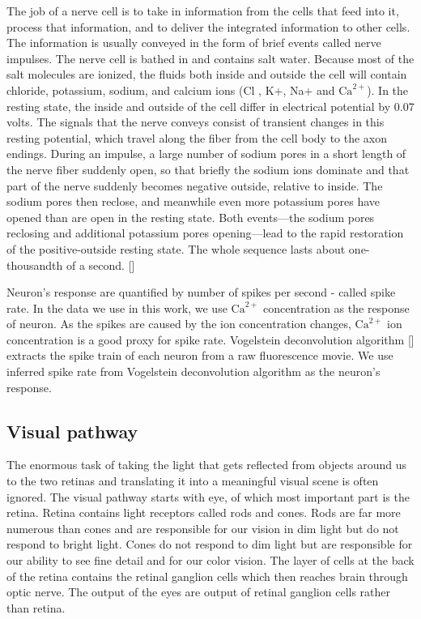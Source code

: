 \documentclass[MTech]{iitmdiss}
\begin{document}
The job of a nerve cell is to take in information from the cells that feed into it, process that information, and to deliver the integrated information to other cells. The information is usually conveyed in the form of brief events called nerve impulses. The nerve cell is bathed in and contains salt water. Because most of the salt molecules are ionized, the fluids both inside and outside the cell will contain chloride, potassium, sodium, and calcium ions (Cl , K+, Na+ and $\text{Ca}^{2+}$).
In the resting state, the inside and outside of the cell differ in electrical potential by 0.07 volts. The signals that the nerve conveys consist of transient changes in this resting potential, which travel along the fiber from the cell body to the axon endings. During an impulse, a large number of sodium pores in a short length of the nerve fiber suddenly open, so that briefly the sodium ions dominate and that part of the nerve suddenly becomes negative outside, relative to inside. The sodium pores then reclose, and meanwhile even more potassium pores have opened than are open in the resting state. Both events—the sodium pores reclosing and additional potassium pores opening—lead to the rapid restoration of the positive-outside resting state. The whole sequence lasts about one-thousandth of a second. [\cite{hubel1995eye}]

Neuron's response are quantified by number of spikes per second - called spike rate. In the data we use in this work, we use $\text{Ca}^{2+}$ concentration as the response of neuron. As the spikes are caused by the ion concentration changes, $\text{Ca}^{2+}$ ion concentration is a good proxy for spike rate. Vogelstein deconvolution algorithm [\cite{vogelstein2010fast}] extracts the spike train of each neuron from a raw fluorescence movie. We use inferred spike rate from Vogelstein deconvolution algorithm as the neuron's response.

\subsection{Visual pathway} %
\label{sub:visual_pathway}
The enormous task of taking the light that gets reflected from objects around us to the two retinas and translating it into a meaningful visual scene is often ignored. The visual pathway starts with eye, of which most important part is the retina. Retina contains light receptors called rods and cones. Rods are far more numerous than cones and are responsible for our vision in dim light but do not respond to bright light. Cones do not respond to dim light but are responsible for our ability to see fine detail and for our color vision. The layer of cells at the back of the retina contains the retinal ganglion cells which then reaches brain through optic nerve. The output of the eyes are output of retinal ganglion cells rather than retina.
\end{document}

